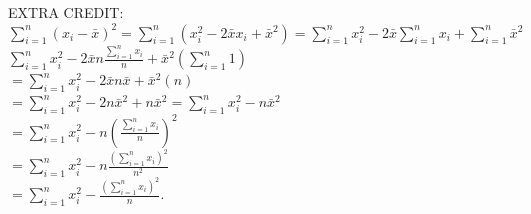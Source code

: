 \documentclass[12pt]{article}
\begin{document}
\newpage
EXTRA CREDIT:\\
$\sum_{i=1}^n(x_i-\bar{x})^2=\sum_{i=1}^n(x^2_i-2\bar{x}x_i+\bar{x}^2)=\sum_{i=1}^nx^2_i-2\bar{x}\sum_{i=1}^nx_i+\sum_{i=1}^n\bar{x}^2$\\
$\sum_{i=1}^nx^2_i-2\bar{x}n\frac{\sum_{i=1}^nx_i}{n}+\bar{x}^2\left(\sum_{i=1}^n1\right)$\\
$=\sum_{i=1}^nx^2_i-2\bar{x}n\bar{x}+\bar{x}^2(n)$\\
$=\sum_{i=1}^nx^2_i-2n\bar{x}^2+n\bar{x}^2=\sum_{i=1}^nx^2_i-n\bar{x}^2$\\
$=\sum_{i=1}^nx^2_i-n\left(\frac{\sum_{i=1}^nx_i}{n}\right)^2$\\
$=\sum_{i=1}^nx^2_i-n\frac{\left(\sum_{i=1}^nx_i\right)^2}{n^2}$\\
$=\sum_{i=1}^nx^2_i-\frac{\left(\sum_{i=1}^nx_i\right)^2}{n}$.
\end{document}
